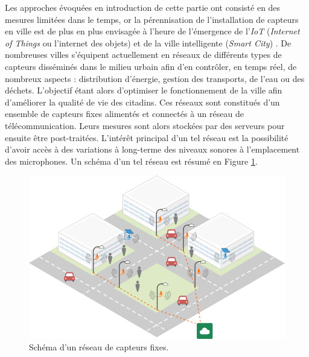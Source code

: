 Les approches évoquées en introduction de cette partie ont consisté en des mesures limitées dans le temps, or la pérennisation de l'installation de capteurs en ville est de plus en plus envisagée à l'heure de l'émergence de l'\textit{IoT} (\textit{Internet of Things} ou l'internet des objets) \cite{zanella2014internet} et de la ville intelligente (\textit{Smart City}) \cite{chourabi2012understanding}. De nombreuses villes s'équipent actuellement en réseaux de différents types de capteurs disséminés dans le milieu urbain afin d'en contrôler, en temps réel, de nombreux aspects : distribution d'énergie, gestion des transports, de l'eau ou des déchets. L'objectif étant alors d'optimiser le fonctionnement de la ville afin d'améliorer la qualité de vie des citadins.
Ces réseaux sont constitués d'un ensemble de capteurs fixes alimentés et connectés à un réseau de télécommunication. Leurs mesures sont alors stockées par des serveurs pour ensuite être post-traitées. L'intérêt principal d'un tel réseau est la possibilité d'avoir accès à des variations à long-terme des niveaux sonores à l'emplacement des microphones. Un schéma d'un tel réseau est résumé en Figure \ref{fig:reseau_capteur}.

\begin{figure}[t]
\centering
\includegraphics[width=0.8\linewidth]{./figures/cartographie/reseau_mesure.png}
\caption[Schéma d'un réseau de capteurs fixes]{Schéma d'un réseau de capteurs fixes\protect\footnotemark .}
\label{fig:reseau_capteur}
\end{figure}


